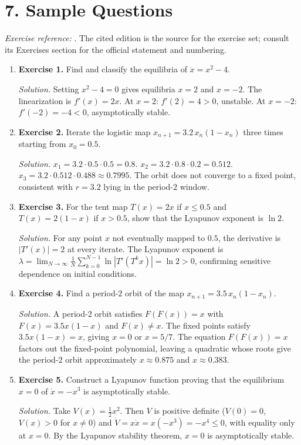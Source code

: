 \section*{7. Sample Questions}
\emph{Exercise reference:} \cite{dynamical_systems_theory_ref1}. The cited edition is the source for the exercise set; consult its Exercises section for the official statement and numbering.
\begin{enumerate}[leftmargin=*,itemsep=0.9em]

\item \textbf{Exercise 1.} Find and classify the equilibria of $\dot x=x^2-4$.

\emph{Solution.} Setting $x^2-4=0$ gives equilibria $x=2$ and $x=-2$. The linearization is $f'(x)=2x$. At $x=2$: $f'(2)=4>0$, unstable. At $x=-2$: $f'(-2)=-4<0$, asymptotically stable.

\item \textbf{Exercise 2.} Iterate the logistic map $x_{n+1}=3.2\,x_n(1-x_n)$ three times starting from $x_0=0.5$.

\emph{Solution.} $x_1=3.2\cdot0.5\cdot0.5=0.8$. $x_2=3.2\cdot0.8\cdot0.2=0.512$. $x_3=3.2\cdot0.512\cdot0.488\approx0.7995$. The orbit does not converge to a fixed point, consistent with $r=3.2$ lying in the period-$2$ window.

\item \textbf{Exercise 3.} For the tent map $T(x)=2x$ if $x\leq0.5$ and $T(x)=2(1-x)$ if $x>0.5$, show that the Lyapunov exponent is $\ln 2$.

\emph{Solution.} For any point $x$ not eventually mapped to $0.5$, the derivative is $|T'(x)|=2$ at every iterate. The Lyapunov exponent is $\lambda=\lim_{N\to\infty}\frac{1}{N}\sum_{k=0}^{N-1}\ln|T'(T^k x)|=\ln 2>0$, confirming sensitive dependence on initial conditions.

\item \textbf{Exercise 4.} Find a period-$2$ orbit of the map $x_{n+1}=3.5\,x_n(1-x_n)$.

\emph{Solution.} A period-$2$ orbit satisfies $F(F(x))=x$ with $F(x)=3.5x(1-x)$ and $F(x)\neq x$. The fixed points satisfy $3.5x(1-x)=x$, giving $x=0$ or $x=5/7$. The equation $F(F(x))=x$ factors out the fixed-point polynomial, leaving a quadratic whose roots give the period-$2$ orbit approximately $x\approx0.875$ and $x\approx0.383$.

\item \textbf{Exercise 5.} Construct a Lyapunov function proving that the equilibrium $x=0$ of $\dot x=-x^3$ is asymptotically stable.

\emph{Solution.} Take $V(x)=\frac{1}{2}x^2$. Then $V$ is positive definite ($V(0)=0$, $V(x)>0$ for $x\neq0$) and $\dot V=x\dot x=x(-x^3)=-x^4\leq0$, with equality only at $x=0$. By the Lyapunov stability theorem, $x=0$ is asymptotically stable.

\end{enumerate}
